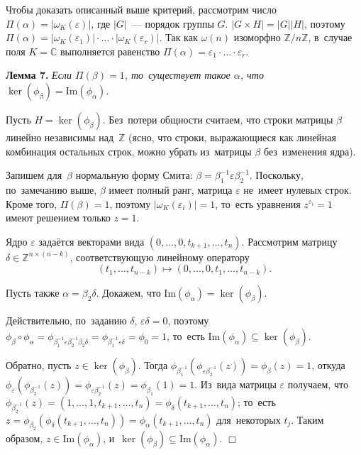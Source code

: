 \documentclass[twoside]{article}
\begin{document}
Чтобы доказать описанный выше критерий, рассмотрим число $\Pi(\alpha) = |\omega_K(\varepsilon)|$, где $|G|$~— порядок группы $G$.
$|G \times H| = |G| |H|$, поэтому $\Pi(\alpha) = |\omega_K(\varepsilon_1)| \cdot \ldots \cdot |\omega_K(\varepsilon_r)|$.
Так как $\omega(n)$ изоморфно $\mathbb{Z} / n \mathbb{Z}$, в~случае поля $K = \mathbb{C}$ выполняется
равенство $\Pi(\alpha) = \varepsilon_1 \cdot \ldots \cdot \varepsilon_r$.

\medskip\noindent\textbf{Лемма 7.}\emph{
    Если $\Pi(\beta) = 1$, то~существует такое $\alpha$, что $\ker(\phi_\beta) = \mathrm{Im}(\phi_\alpha)$.
}\medskip

    Пусть $H = \ker(\phi_\beta)$. Без~потери общности считаем, что строки матрицы $\beta$ линейно независимы над~$\mathbb{Z}$
    (ясно, что строки, выражающиеся как линейная комбинация остальных строк, можно убрать из~матрицы $\beta$ без~изменения ядра).

    Запишем для~$\beta$ нормальную форму Смита: $\beta = \beta_1^{-1} \varepsilon \beta_2^{-1}$.
    Поскольку, по~замечанию выше, $\beta$ имеет полный ранг, матрица $\varepsilon$ не~имеет нулевых строк.
    Кроме того, $\Pi(\beta) = 1$, поэтому $|\omega_K(\varepsilon_i)| = 1$, то~есть уравнения $z^{\varepsilon_i} = 1$
    имеют решением только $z = 1$.

    Ядро $\varepsilon$ задаётся векторами вида $(0, \ldots, 0, t_{k + 1}, \ldots, t_{n})$.
    Рассмотрим матрицу $\delta \in \mathbb{Z}^{n \times (n - k)}$, соответствующую линейному оператору
    $$
        (t_1, \ldots, t_{n - k}) \mapsto (0, \ldots, 0, t_1, \ldots, t_{n - k}).
    $$

    Пусть также $\alpha = \beta_2 \delta$. Докажем, что $\mathrm{Im}(\phi_\alpha) = \ker(\phi_\beta)$.

    Действительно, по~заданию $\delta$, $\varepsilon \delta = 0$, поэтому 
    $\phi_{\beta} \circ \phi_{\alpha} = \phi_{\beta_1^{-1} \varepsilon \beta_2^{-1} \beta_2 \delta} = \phi_{\beta_1^{-1} \varepsilon \delta} = \phi_{0} = 1$,
    то~есть $\mathrm{Im}(\phi_{\alpha}) \subseteq \ker(\phi_{\beta})$.

    Обратно, пусть $z \in \ker(\phi_\beta)$. Тогда $\phi_{\beta_1^{-1}} (\phi_{\varepsilon \beta_2^{-1}}(z)) = \phi_\beta(z) = 1$,
    откуда $\phi_{\varepsilon}(\phi_{\beta_2^{-1}}(z)) = \phi_{\varepsilon \beta_2^{-1}}(z) = \phi_{\beta_1}(1) = 1$.
    Из~вида матрицы $\varepsilon$ получаем, что $\phi_{\beta_2^{-1}}(z) = (1, \ldots, 1, t_{k + 1}, \ldots, t_n) = \phi_\delta(t_{k + 1}, \ldots, t_n)$;
    то~есть $z = \phi_{\beta_2}(\phi_\delta(t_{k + 1}, \ldots, t_n)) = \phi_\alpha(t_{k + 1}, \ldots, t_n)$ для~некоторых $t_j$.
    Таким образом, $z \in \mathrm{Im}(\phi_\alpha)$, и~$\ker(\phi_\beta) \subseteq \mathrm{Im}(\phi_\alpha)$.
\hfill$\Box$\medskip
\end{document}
